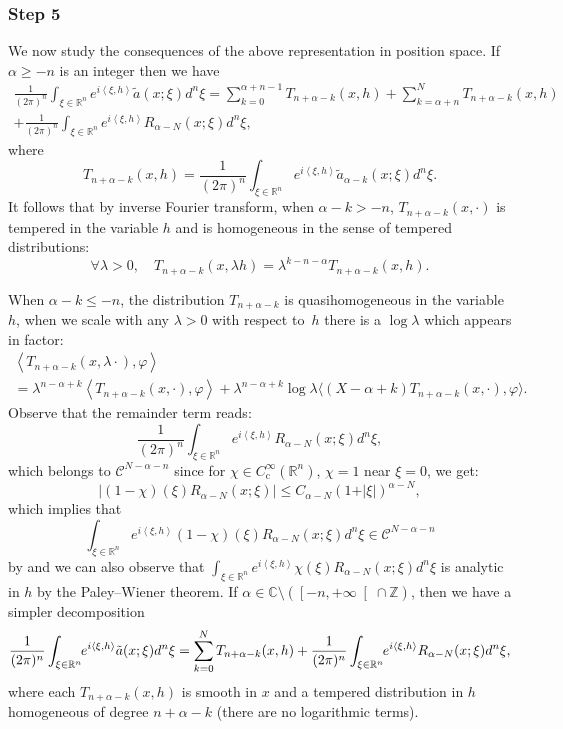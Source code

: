 \documentclass[10pt]{amsart}
\let\pazocal\mathscr
\theoremstyle{definition}
\renewcommand\c{\mathrm{c}}
\let\cv\alpha
\let\asigma a
\let\euler X
\newcommand{\clopen}[1]{\mathopen{}\mathclose{\left[#1 \right[}}
\newcommand{\step}[1]{\subsubsection*{Step #1}}
\begin{document}
\step{5} We now study the consequences of the above representation in position space. If $\cv\geqslant -n$ is an integer then we have
\begin{multline*}
\frac{1}{(2\pi)^n}\int_{\xi\in \mathbb{R}^n} e^{i\left\langle \xi,h\right\rangle} \tilde{\asigma}(x;\xi)d^n\xi =
\sum_{k=0}^{\cv+n-1} T_{n+\cv-k}(x,h) + \sum_{k=\cv+n}^{N} T_{n+\cv-k}(x,h) \\
+\frac{1}{(2\pi)^n}\int_{\xi\in \mathbb{R}^n} e^{i\left\langle \xi,h\right\rangle}R_{\cv-N}(x;\xi)d^n\xi,
\end{multline*}
where
\[
T_{n+\cv-k}(x,h)=\frac{1}{(2\pi)^n}\int_{\xi\in \mathbb{R}^n} e^{i\left\langle \xi,h\right\rangle} \tilde{\asigma}_{\cv-k}(x;\xi)d^n\xi.
\]
It follows that by inverse Fourier transform, when $\cv-k>-n $, $ T_{n+\cv-k}(x,\cdot)$ is tempered in the variable $h$ and is homogeneous in the sense of tempered distributions:
\[
\forall \lambda>0, \quad T_{n+\cv-k}(x,\lambda h)=\lambda^{k-n-\cv}T_{n+\cv-k}(x,h).
\]

When $\cv-k\leqslant -n $, the distribution $T_{n+\cv-k}$ is quasihomogeneous in the variable~$h$, \ie when we scale with any $\lambda>0$ with respect to~$h$ there is a $\log\lambda$ which appears in factor:
\begin{multline*}
\left\langle T_{n+\cv-k}(x,\lambda\cdot),\varphi\right\rangle\\
=\lambda^{n- \cv+k} \left\langle T_{n+\cv-k}(x,\cdot),\varphi\right\rangle+\lambda^{n- \cv+k}\log\lambda\langle (\euler-\cv+k) T_{n+\cv-k}(x,\cdot),\varphi\rangle.
\end{multline*}
Observe that the remainder term
reads:
\[
\frac{1}{(2\pi)^n}\int_{\xi\in \mathbb{R}^n} e^{i\left\langle \xi,h\right\rangle}R_{\cv-N}(x;\xi)d^n\xi,
\]
which belongs to $\pazocal{C}^{N-\cv-n}$ since for $\chi\in C^\infty_\c(\mathbb{R}^n)$, $\chi=1$ near $\xi=0$, we get:
\[
\vert (1-\chi)(\xi) R_{\cv-N}(x;\xi) \vert\leqslant C_{\cv-N}(1+\vert \xi\vert)^{\cv-N},
\]
which implies that
\[
\int_{\xi\in \mathbb{R}^n} e^{i\left\langle \xi,h\right\rangle}(1-\chi)(\xi)R_{\cv-N}(x;\xi)d^n\xi\in \pazocal{C}^{N-\cv-n}
\]
by \cite[Lem.\,D.2]{Dang2020} and we can also observe that $\int_{\xi\in \mathbb{R}^n} e^{i\left\langle \xi,h\right\rangle}\chi(\xi)R_{\cv-N}(x;\xi)d^n\xi$ is analytic in $h$ by the Paley--Wiener theorem.
If $\cv\in\mathbb{C}\setminus(\clopen{-n,+\infty}\cap \mathbb{Z})$, then we have a simpler decomposition
\[
\frac{1}{(2\pi)^n}\int_{\xi\in \mathbb{R}^n}\hspace*{-1mm} e^{i\left\langle \xi,h\right\rangle} \tilde{\asigma}(x;\xi)d^n\xi =
\sum_{k=0}^{N} T_{n+\cv-k}(x,h) +
\frac{1}{(2\pi)^n}\int_{\xi\in \mathbb{R}^n}\hspace*{-1mm} e^{i\left\langle \xi,h\right\rangle}R_{\cv-N}(x;\xi)d^n\xi,
\]
where each $T_{n+\cv-k}(x,h)$ is smooth in $x$ and a tempered distribution in $h$ homogeneous of degree $n+\cv-k$ (there are no logarithmic terms).
\end{document}
